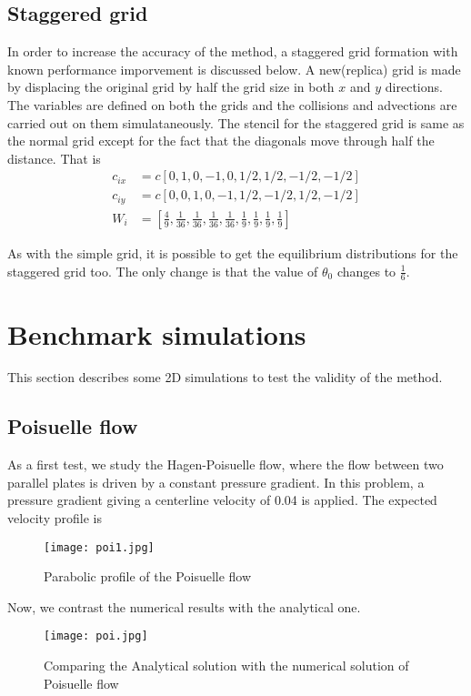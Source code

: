 \documentclass[titlepage,a4paper,10pt]{article}
\begin{document}
\subsection{Staggered grid}
In order to increase the accuracy of the method, a staggered grid formation with known performance imporvement is discussed below. 
A new(replica) grid is made by displacing the original grid by half the grid size in both $x$ and $y$ directions. The variables are defined on both the grids and the collisions and advections are carried out on them simulataneously. The stencil for the staggered grid is same as the normal grid except for the fact that the diagonals move through half the distance. That is
\begin{equation}
\begin{aligned}
c_{ix} &= c\left[0,1,0,-1,0,1/2,1/2,-1/2,-1/2\right] \\
c_{iy} &= c\left[0,0,1,0,-1,1/2,-1/2,1/2,-1/2\right] \\
W_i &= \left[\frac{4}{9},\frac{1}{36},\frac{1}{36},\frac{1}{36},\frac{1}{36},\frac{1}{9},\frac{1}{9},\frac{1}{9},\frac{1}{9}\right]
\end{aligned} 
\end{equation}


As with the simple grid, it is possible to get the equilibrium distributions for the staggered grid too. The only change is that the value of $\theta_0$ changes to $\frac{1}{6}$.

\section{Benchmark simulations}
This section describes some 2D simulations to test the validity of the method.
\subsection{Poisuelle flow}
As a first test, we study the Hagen-Poisuelle flow, where the flow between two parallel plates is driven by a constant pressure gradient. In this problem, a pressure gradient giving a centerline velocity of 0.04 is applied. The expected velocity profile is
\begin{figure}[H]
\centering
\texttt{[image: poi1.jpg]}
\caption{Parabolic profile of the Poisuelle flow}
\label{overflow}
\end{figure}
Now, we contrast the numerical results with the analytical one.
\begin{figure}[H]
\centering
\texttt{[image: poi.jpg]}
\caption{Comparing the Analytical solution with the numerical solution of Poisuelle flow}
\label{overflow}
\end{figure}
\end{document}
